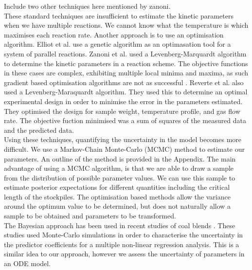 Include two other techniques here mentioned by zanoni.\\

These standard techniques are insufficient to estimate the kinetic parameters when we have multiple reactions. We cannot know what the temperature is which maximises each reaction rate. Another approach is to use an optimisation algorithm. Elliot et al. \cite{elliot05} use a genetic algorithm as an optimasation tool for a system of parallel reactions.  Zanoni et al. \cite{zanoni12} used a Levenberg-Marquardt algorithm to determine the kinetic parameters in a reaction scheme. The objective functions in these cases are complex, exhibiting multiple local minima and maxima, as such gradient based optimisation algorithms are not as successful \cite{elliott05}. Reverte et al. \cite{reverte07} also used a Levenberg-Maraquardt algorithm. They used this to determine an optimal experimental design in order to minimise the error in the parameters estimated. They optimised the design for sample weight, temperature profile, and gas flow rate. The objective fuction minimised was a sum of squares of the measured data and the predicted data.\\
Using these techniques, quantifying the uncertainty in the model becomes more difficult. We use a Markov-Chain Monte-Carlo (MCMC) method to estimate our parameters. An outline of the method is provided in the Appendix. The main advantage of using a MCMC algorithm, is that we are able to draw a sample from the distribution of possible parameter values. We can use this sample to estimate posterior expectations for different quantities including the critical length of the stockpiles. The optimisation based methods allow the variance around the optimum value to be determined, but does not naturally allow a sample to be obtained and parameters to be transformed.\\
The Bayesian approach has been used in recent studies of coal blends \cite{buyu17,buyu17p}. These studies used Monte-Carlo simulations in order to characterise the uncertainty in the predictor coefficients for a multiple non-linear regression analysis. This is a similar idea to our approach, however we assess the uncertainty of parameters in an ODE model.\\

